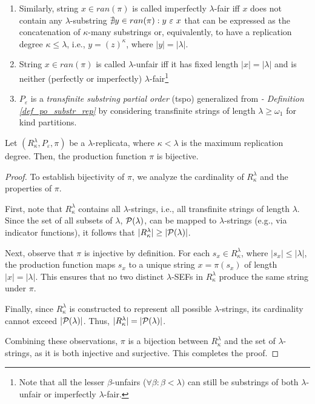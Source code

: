 \begin{definition}
\begin{enumerate}[label=(\roman*)]
        \item Similarly, string $x \in ran(\pi)$ is called imperfectly $\lambda$-fair iff $x$ does not contain any $\lambda$-substring $\nexists y \in ran(\pi): y \ \varepsilon\  x$ that can be expressed as the concatenation of $\kappa$-many substrings or, equivalently, to have a replication degree $\kappa \leq \lambda$, i.e., $y = (z)^\kappa$, where $|y| = |\lambda|$.
        \item String $x \in ran(\pi)$ is called $\lambda$-unfair iff it has fixed length $|x| = |\lambda|$ and is neither (perfectly or imperfectly) $\lambda$-fair\footnote{Note that all the lesser $\beta$-unfairs ($\forall \beta: \beta < \lambda)$ can still be substrings of both $\lambda$-unfair or imperfectly $\lambda$-fair.}
        \item $P_{\varepsilon}$ is a \textit{transfinite substring partial order} (tspo) generalized from \textit{ - Definition \ref{def_po_substr_rep}} by considering transfinite strings of length $\lambda \geq \omega_1$ for kind partitions.
    \end{enumerate}
\end{definition}

\begin{lemma}\label{lemma_pi_biject_lambda_rep}
    Let $(R^\lambda_\kappa, P_{\varepsilon}, \pi)$ be a $\lambda$-replicata, where $\kappa < \lambda$ is the maximum replication degree. Then, the production function $\pi$ is bijective.
\end{lemma}
\begin{proof}
    To establish bijectivity of $\pi$, we analyze the cardinality of $R^\lambda_\kappa$ and the properties of $\pi$.

    First, note that $R^\lambda_\kappa$ contains all $\lambda$-strings, i.e., all transfinite strings of length $\lambda$. Since the set of all subsets of $\lambda$, $\mathcal{P}(\lambda)$, can be mapped to $\lambda$-strings (e.g., via indicator functions), it follows that $|R^\lambda_\kappa| \geq |\mathcal{P}(\lambda)|$.

    Next, observe that $\pi$ is injective by definition. For each $s_x \in R^\lambda_\kappa$, where $|s_x| \leq |\lambda|$, the production function maps $s_x$ to a unique string $x = \pi(s_x)$ of length $|x| = |\lambda|$. This ensures that no two distinct $\lambda$-SEFs in $R^\lambda_\kappa$ produce the same string under $\pi$.

    Finally, since $R^\lambda_\kappa$ is constructed to represent all possible $\lambda$-strings, its cardinality cannot exceed $|\mathcal{P}(\lambda)|$. Thus, $|R^\lambda_\kappa| = |\mathcal{P}(\lambda)|$.

    Combining these observations, $\pi$ is a bijection between $R^\lambda_\kappa$ and the set of $\lambda$-strings, as it is both injective and surjective. This completes the proof.
\end{proof}

